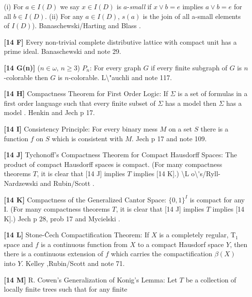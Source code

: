 (i) For $a\in I(D)$ we say $x\in I(D)$ is $a$-{\it small} if $x\vee b = e$
implies $a\vee b = e$ for all $b \in I(D)$. (ii) For any $a\in I(D)$,
$s(a)$ is the join of all a-small elements of $I(D)$).
\ac{Banaschewski/Harting} \cite{1985} and \ac{Blass} \cite{1986}.
\smallskip
\item{}{\bf [14 F]} Every non-trivial complete distributive lattice with
compact unit has a prime ideal.  \ac{Banaschewski} \cite{1985} and note 29.
\smallskip
\item{}{\bf [14 G(n)]} ($n\in \omega$, $n\ge 3$) $P_{n}$:  For
every graph $G$ if every finite subgraph of $G$ is $n$-colorable
then $G$ is $n$-colorable.  \ac{L\"auchli} \cite{1971} and note 117.
\smallskip
\item{}{\bf [14 H]}  Compactness Theorem for First Order Logic:
If $\Sigma$ is a set of formulas in a first order language such that
every finite subset of $\Sigma$ has a model then $\Sigma$ has a model .
\ac{Henkin} \cite{1954a} and \ac{Jech} \cite{1973b} p 17.
\smallskip
\item{}{\bf [14 I]}  Consistency Principle:  For every binary mess $M$ on
a set $S$ there is a function $f$ on $S$ which is consistent with $M$.
\ac{Jech} \cite{1973b} p 17 and note 109.
\smallskip
\item{}{\bf [14 J]} Tychonoff's Compactness Theorem for Compact Hausdorff
Spaces: The product of compact Hausdorff spaces is compact. (For many
compactness theorems $T$, it is clear that [14 J] implies $T$ implies
[14 K].)  \ac{\L o\'s/Ryll-Nardzewski} \cite{1954} and \ac{Rubin/Scott}
\cite{1954}. 
\smallskip
\item{}{\bf [14 K]} Compactness of the Generalized Cantor Space:
$\{0,1\}^I$ is compact for any I. (For many compactness theorems $T$, it
is clear that [14 J] implies $T$ implies [14 K].)  \ac{Jech} \cite{1973b}
p 28, prob 17 and \ac{Mycielski} \cite{1964}.
\smallskip
\item{}{\bf [14 L]}  Stone-\v Cech Compactification Theorem:  If $X$ is
a completely regular, T$_1$ space and $f$ is a continuous function from
$X$ to a compact Hausdorf space $Y$, then there is a continuous extension
of $f$ which carries the compactification $\beta(X)$ into $Y$.
\ac{Kelley} \cite{1955},\ac{Rubin/Scott} \cite{1954} and note 71.
\smallskip
\item{}{\bf [14 M]}  R. Cowen's Generalization of Konig's Lemma:  Let
$T$ be a collection of locally finite trees such that for any finite
